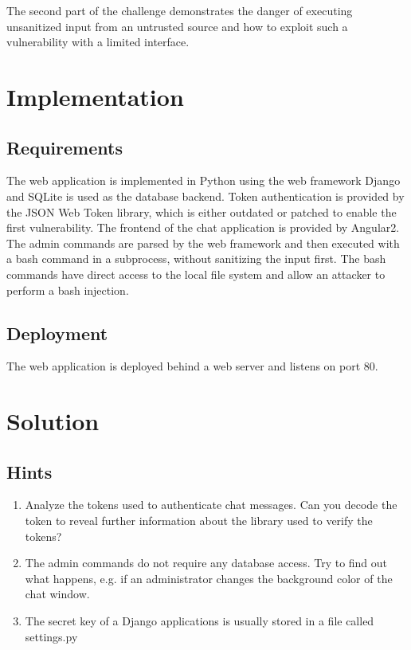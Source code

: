 \documentclass[12pt,a4paper]{article}
\begin{document}
The second part of the challenge demonstrates the danger of executing unsanitized input from an untrusted source and how to exploit such a vulnerability with a limited interface.


\section{Implementation}
\subsection{Requirements}

The web application is implemented in Python using the web framework Django and SQLite is used as the database backend. Token authentication is provided by the JSON Web Token library, which is either outdated or patched to enable the first vulnerability. The frontend of the chat application is provided by Angular2. The admin commands are parsed by the web framework and then executed with a bash command in a subprocess, without sanitizing the input first. The bash commands have direct access to the local file system and allow an attacker to perform a bash injection.


\subsection{Deployment}
The web application is deployed behind a web server and listens on port 80.


\section{Solution}

\subsection{Hints}
\begin{enumerate}
	\item Analyze the tokens used to authenticate chat messages. Can you decode the token to reveal further information about the library used to verify the tokens?
	\item The admin commands do not require any database access. Try to find out what happens, e.g. if an administrator changes the background color of the chat window.
	\item The secret key of a Django applications is usually stored in a file called settings.py
\end{enumerate}
\end{document}
